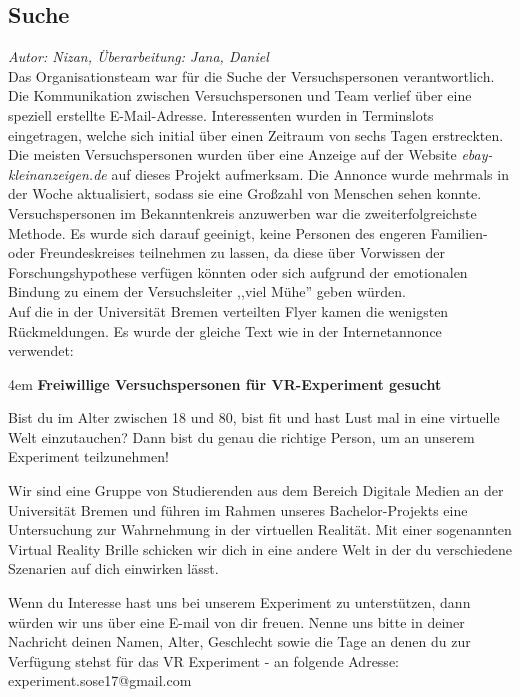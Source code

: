 \documentclass{Bericht}
\begin{document}
\subsection{Suche}
\textit{Autor: Nizan, Überarbeitung: Jana, Daniel}\\
Das Organisationsteam war für die Suche der Versuchspersonen verantwortlich. Die Kommunikation zwischen Versuchspersonen und Team verlief über eine speziell erstellte E-Mail-Adresse. Interessenten wurden in Terminslots eingetragen, welche sich initial über einen Zeitraum von sechs Tagen erstreckten. 
Die meisten Versuchspersonen wurden über eine Anzeige auf der Website \textit{ebay-kleinanzeigen.de} auf dieses Projekt aufmerksam. Die Annonce wurde mehrmals in der Woche aktualisiert, sodass sie eine Großzahl von Menschen sehen konnte.\\
Versuchspersonen im Bekanntenkreis anzuwerben war die zweiterfolgreichste Methode. Es wurde sich darauf geeinigt, keine Personen des engeren Familien- oder Freundeskreises teilnehmen zu lassen, da diese über Vorwissen der Forschungshypothese verfügen könnten oder sich aufgrund der emotionalen Bindung zu einem der Versuchsleiter ,,viel Mühe'' geben würden.\\
Auf die in der Universität Bremen verteilten Flyer kamen die wenigsten Rückmeldungen. Es wurde der gleiche Text wie in der Internetannonce verwendet:\\

\par
\begingroup
\leftskip4em
\textbf{Freiwillige Versuchspersonen für VR-Experiment gesucht}

Bist du im Alter zwischen 18 und 80, bist fit und hast Lust mal in eine virtuelle Welt einzutauchen? Dann bist du genau die richtige Person, um an unserem Experiment teilzunehmen!

Wir sind eine Gruppe von Studierenden aus dem Bereich Digitale Medien an der Universität Bremen und führen im Rahmen unseres Bachelor-Projekts eine Untersuchung zur Wahrnehmung in der virtuellen Realität. Mit einer sogenannten Virtual Reality Brille schicken wir dich in eine andere Welt in der du verschiedene Szenarien auf dich einwirken lässt.

Wenn du Interesse hast uns bei unserem Experiment zu unterstützen, dann würden wir uns über eine E-mail von dir freuen. Nenne uns bitte in deiner Nachricht deinen Namen, Alter, Geschlecht sowie die Tage an denen du zur Verfügung stehst für das VR Experiment - an folgende Adresse: experiment.sose17@gmail.com \\
\end{document}
